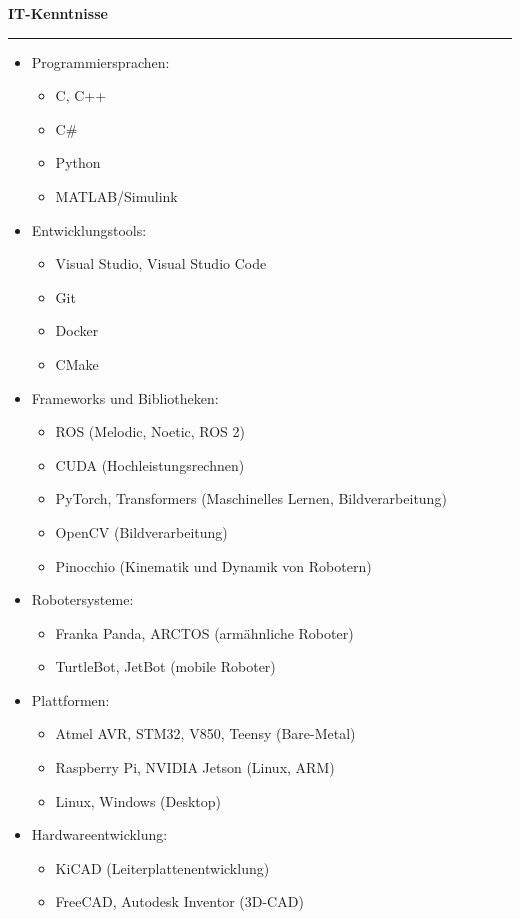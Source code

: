 \documentclass[12pt]{article} %
\newcommand{\HighlightedText}[1] {{\textbf{#1}}}
\newenvironment{ItemizeSection}[1]{
    \vspace{1mm}
    \HighlightedText{#1}
    \vspace{0.5mm}
    {\color{custom_blue} \hrule}
    \begin{itemize}[left=0.5em, topsep=0pt, itemsep=0pt, label={$\bullet$}]
}{
    \end{itemize}
}
\newenvironment{ItemizeSubsection}{
    \begin{itemize}[left=0.5em, topsep=-999pt, itemsep=0pt, label={$\circ$}]
}{
    \end{itemize}
}
\begin{document}
\newpage
\begin{ItemizeSection}{IT-Kenntnisse}
\item Programmiersprachen:
    \begin{ItemizeSubsection}
        \item C, C++
        \item C\#
        \item Python
        \item MATLAB/Simulink
    \end{ItemizeSubsection}
    \item Entwicklungstools:
    \begin{ItemizeSubsection}
        \item Visual Studio, Visual Studio Code
        \item Git
        \item Docker
        \item CMake
    \end{ItemizeSubsection}
    \item Frameworks und Bibliotheken:
    \begin{ItemizeSubsection}
        \item ROS (Melodic, Noetic, ROS 2)
        \item CUDA (Hochleistungsrechnen)
        \item PyTorch, Transformers (Maschinelles Lernen, Bildverarbeitung)
        \item OpenCV (Bildverarbeitung)
        \item Pinocchio (Kinematik und Dynamik von Robotern)
    \end{ItemizeSubsection}
    \item Robotersysteme:
    \begin{ItemizeSubsection}
        \item Franka Panda, ARCTOS (armähnliche Roboter)
        \item TurtleBot, JetBot (mobile Roboter)
    \end{ItemizeSubsection}
    \item Plattformen:
    \begin{ItemizeSubsection}
        \item Atmel AVR, STM32, V850, Teensy (Bare-Metal)
        \item Raspberry Pi, NVIDIA Jetson (Linux, ARM)
        \item Linux, Windows (Desktop)
    \end{ItemizeSubsection}
    \item Hardwareentwicklung:
    \begin{ItemizeSubsection}
        \item KiCAD (Leiterplattenentwicklung)
        \item FreeCAD, Autodesk Inventor (3D-CAD)
    \end{ItemizeSubsection}
\end{ItemizeSection}
\end{document}
